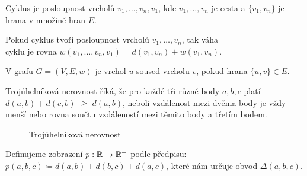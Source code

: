 \begin{definition}[Cyklus]
  \label{definice:cyklus}
  Cyklus je posloupnost vrcholů $v_1,\ldots,v_n,v_1$, kde $v_1,\ldots,v_n$ je cesta a  $\{v_1,v_n\}$ je hrana v množině hran $E$.
\end{definition}

\begin{definition}
  \label{definice:vaha_cyklu}
  Pokud cyklus tvoří posloupnost vrcholů $v_1, \ldots, v_n$, tak váha \\cyklu je rovna $w(v_1,\dots ,v_n, v_1) = d(v_1, v_n) + w(v_1, v_n)$.
\end{definition}

\begin{definition}[Soused]
  \label{definice:soused}
  V grafu $G = (V, E, w)$ je vrchol $u$ soused vrcholu $v$, pokud hrana $\{u, v\} \in E$.
\end{definition}

\begin{tvrzeni}
  \label{tvrzeni:trojuhelnikova_nerovnost}
  Trojúhelníková nerovnost říká, že pro kaž\-dé tři různé body $a, b, c$ platí \textcolor{myblue}{$d(a, b)+d(c, b)$} $\geq$ \textcolor{myred}{$d(a,b)$}, neboli vzdálenost mezi dvěma body je vždy menší nebo rovna součtu vzdáleností mezi těmito body a třetím bodem.

  \begin{figure}[h]
    \centering
    \caption{Trojúhelníková nerovnost}
  \end{figure}
\end{tvrzeni}

\begin{definition}
  \label{definice:obvod_troj}
  Definujeme zobrazení $p: \mathbb{R}\rightarrow \mathbb{R}^+$ podle předpisu: $p(a, b, c) \coloneqq d(a, b) + d(b, c) + d(a, c)$, které nám určuje obvod $\Delta(a,b,c)$.
\end{definition}

